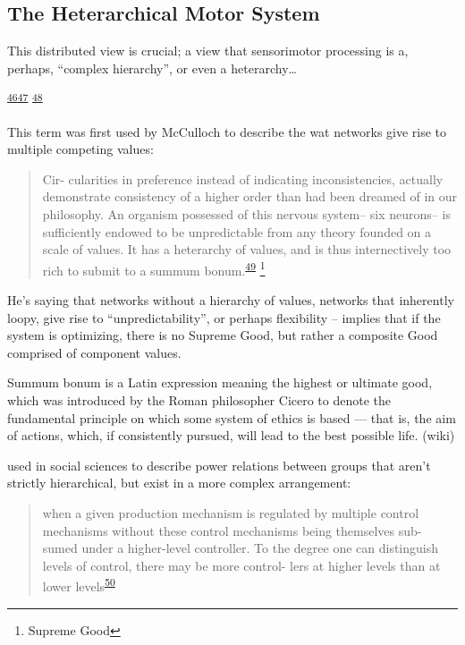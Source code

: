 \documentclass[
  a4paper,
]{article}
\begin{document}
\hypertarget{the-heterarchical-motor-system}{%
\subsection{The Heterarchical Motor
System}\label{the-heterarchical-motor-system}}

This distributed view is crucial; a view that sensorimotor processing is
a, perhaps, ``complex hierarchy'', or even a heterarchy\ldots{}

\textsuperscript{\protect\hyperlink{ref-cohenRoleHeterarchicalControl1992}{46}}\textsuperscript{\protect\hyperlink{ref-huntDistributedHierarchicalRecurrent2017}{47}}
\textsuperscript{\protect\hyperlink{ref-huntHierarchicalCompetitionsSubserving2014}{48}}

This term was first used by McCulloch to describe the wat networks give
rise to multiple competing values:

\begin{quote}
Cir- cularities in preference instead of indicating inconsistencies,
actually demonstrate consistency of a higher order than had been dreamed
of in our philosophy. An organism possessed of this nervous system-- six
neurons-- is sufficiently endowed to be unpredictable from any theory
founded on a scale of values. It has a heterarchy of values, and is thus
internectively too rich to submit to a summum
bonum.\textsuperscript{\protect\hyperlink{ref-mccullochHeterarchyValuesDetermined1945}{49}}
\footnote{Supreme Good}
\end{quote}

He's saying that networks without a hierarchy of values, networks that
inherently loopy, give rise to ``unpredictability'', or perhaps
flexibility -- implies that if the system is optimizing, there is no
Supreme Good, but rather a composite Good comprised of component values.

Summum bonum is a Latin expression meaning the highest or ultimate good,
which was introduced by the Roman philosopher Cicero to denote the
fundamental principle on which some system of ethics is based --- that
is, the aim of actions, which, if consistently pursued, will lead to the
best possible life. (wiki)

used in social sciences to describe power relations between groups that
aren't strictly hierarchical, but exist in a more complex arrangement:

\begin{quote}
when a given production mechanism is regulated by multiple control
mechanisms without these control mechanisms being themselves sub- sumed
under a higher-level controller. To the degree one can distinguish
levels of control, there may be more control- lers at higher levels than
at lower
levels\textsuperscript{\protect\hyperlink{ref-crumleyHeterarchyAnalysisComplex2008}{50}}
\end{quote}
\end{document}
